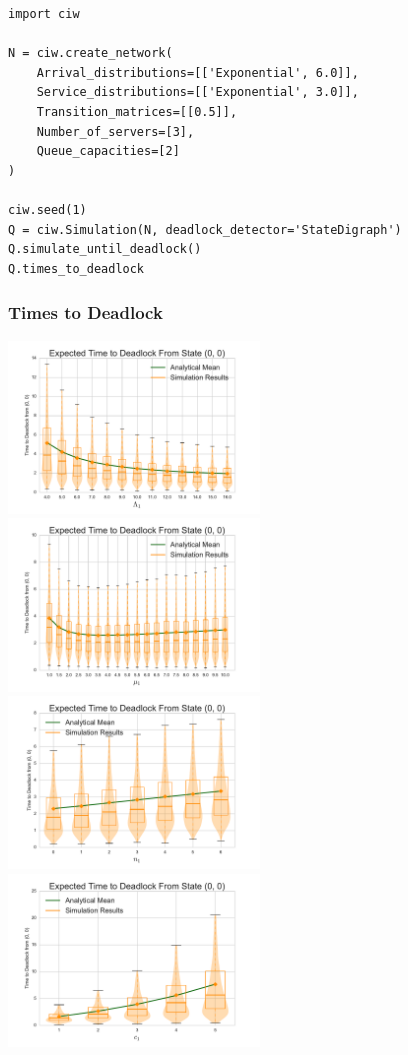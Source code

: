 \documentclass[xcolor={table}]{beamer}
\begin{document}
\begin{frame}[fragile]
\begin{verbatim}
import ciw

N = ciw.create_network(
    Arrival_distributions=[['Exponential', 6.0]],
    Service_distributions=[['Exponential', 3.0]],
    Transition_matrices=[[0.5]],
    Number_of_servers=[3],
    Queue_capacities=[2]
)

ciw.seed(1)
Q = ciw.Simulation(N, deadlock_detector='StateDigraph')
Q.simulate_until_deadlock()
Q.times_to_deadlock
\end{verbatim}
\end{frame}


\begin{frame}
\begin{center}

\end{center}
\end{frame}

\begin{frame}
    \frametitle{Times to Deadlock}
    \includegraphics[width=0.5\textwidth]{../images/varyL1_2Nms}
    \includegraphics[width=0.5\textwidth]{../images/varymu1_2Nms}\newline
    \includegraphics[width=0.5\textwidth]{../images/varyn1_2Nms}
    \includegraphics[width=0.5\textwidth]{../images/varyc1_2Nms}
\end{frame}
\end{document}
